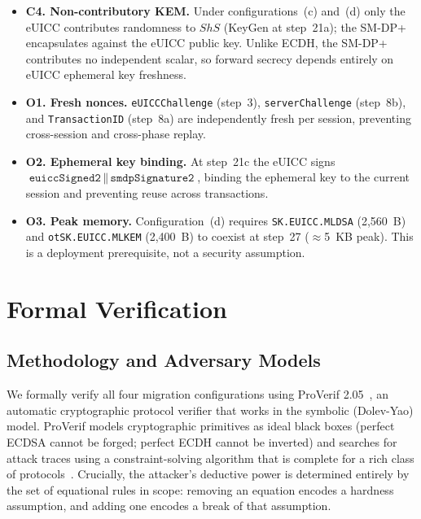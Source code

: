 \documentclass[a4paper,fleqn]{cas-sc}
\begin{document}
\begin{itemize}[leftmargin=*, noitemsep, topsep=4pt]
  \item \textbf{C4. Non-contributory KEM.} Under configurations~(c) and~(d)
  only the eUICC contributes randomness to $\mathit{ShS}$ (KeyGen at
  step~21a); the SM-DP+ encapsulates against the eUICC public key.
  Unlike ECDH, the SM-DP+ contributes no independent scalar, so
  forward secrecy depends entirely on eUICC ephemeral key freshness.

  \item \textbf{O1. Fresh nonces.} \texttt{eUICCChallenge} (step~3),
  \texttt{serverChallenge} (step~8b), and \texttt{TransactionID}
  (step~8a) are independently fresh per session, preventing cross-session
  and cross-phase replay.

  \item \textbf{O2. Ephemeral key binding.} At step~21c the eUICC signs
  $\texttt{euiccSigned2} \,\|\, \texttt{smdpSignature2}$, binding the
  ephemeral key to the current session and preventing reuse across
  transactions.

  \item \textbf{O3. Peak memory.} Configuration~(d) requires
  \texttt{SK.EUICC.MLDSA} (2,560~B) and \texttt{otSK.EUICC.MLKEM}
  (2,400~B) to coexist at step~27 ($\approx$5~KB peak). This is a
  deployment prerequisite, not a security assumption.

\end{itemize}

\section{Formal Verification}
\label{sec:formal}

\subsection{Methodology and Adversary Models}
\label{sec:fv-method}

We formally verify all four migration configurations using
ProVerif 2.05~\cite{blanchet2016proverif}, an automatic cryptographic
protocol verifier that works in the symbolic (Dolev-Yao) model. ProVerif
models cryptographic primitives as ideal black boxes (perfect ECDSA
cannot be forged; perfect ECDH cannot be inverted) and searches for
attack traces using a constraint-solving algorithm that is complete for a
rich class of protocols~\cite{blanchet2004automatic}. Crucially, the
attacker's deductive power is determined entirely by the set of
equational rules in scope: removing an equation encodes a hardness
assumption, and adding one encodes a break of that assumption.
\end{document}

